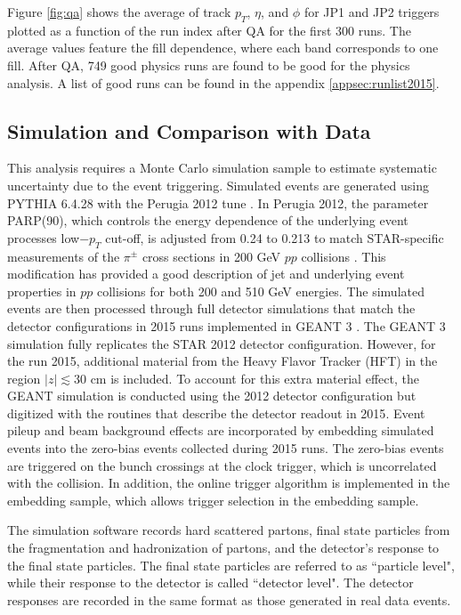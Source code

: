 Figure \ref{fig:qa} shows the average of track $p_T$, $\eta$, and $\phi$ for JP1 and JP2 triggers plotted as a function of the run index after QA for the first 300 runs. The average values feature the fill dependence, where each band corresponds to one fill. After QA, 749 good physics runs are found to be good for the physics analysis. A list of good runs can be found in the appendix \ref{appsec:runlist2015}.

\subsection{Simulation and Comparison with Data}
This analysis requires a Monte Carlo simulation sample to estimate systematic uncertainty due to the event triggering. Simulated events are generated using PYTHIA 6.4.28 \cite{pythia} with the Perugia 2012 tune \cite{Skands:2010ak}. In Perugia 2012, the parameter PARP(90), which controls the energy dependence of the underlying event processes low$-p_T$ cut-off, is adjusted from 0.24 to 0.213 to match STAR-specific measurements of the $\pi^\pm$ cross sections in 200 GeV $pp$ collisions \cite{STAR:2003oii, STAR:2011iap}. This modification has provided a good description of jet and underlying event properties in $pp$ collisions for both 200 \cite{STAR:2019cie, STAR:2020ejj, STAR:2021lvw} and 510 \cite{STAR:2019yqm} GeV energies. The simulated events are then processed through full detector simulations that match the detector configurations in 2015 runs implemented in GEANT 3 \cite{geant}. The GEANT 3 simulation fully replicates the STAR 2012 detector configuration. However, for the run 2015, additional material from the Heavy Flavor Tracker (HFT) \cite{Bouchet:2009id} in the region $|z| \lesssim 30$ cm is included. To account for this extra material effect, the GEANT simulation is conducted using the 2012 detector configuration but digitized with the routines that describe the detector readout in 2015\cite{STAR:2022hqg}. Event pileup and beam background effects are incorporated by embedding simulated events into the zero-bias events collected during 2015 runs. The zero-bias events are triggered on the bunch crossings at the clock trigger, which is uncorrelated with the collision. In addition, the  online trigger algorithm is implemented in the embedding sample, which allows trigger selection in the embedding sample.

The simulation software records hard scattered partons, final state particles from the fragmentation and hadronization of partons, and the detector's response to the final state particles. The final state particles are referred to as ``particle level", while their response to the detector is called  ``detector level". The detector responses are recorded in the same format as those generated in real data events. 

